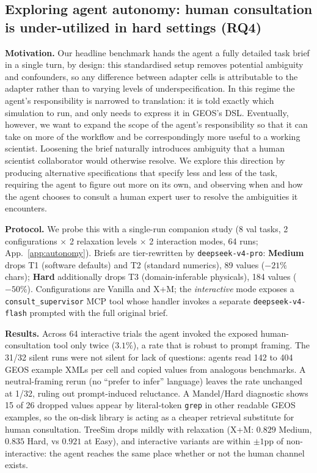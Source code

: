 \documentclass{article}
\begin{document}
\subsection{Exploring agent autonomy: human consultation is under-utilized in hard settings (RQ4)}
\label{subsec:autonomy}

\textbf{Motivation.} Our headline benchmark hands the agent a fully detailed task brief in a single turn, by design: this standardised setup removes potential ambiguity and confounders, so any difference between adapter cells is attributable to the adapter rather than to varying levels of underspecification. In this regime the agent's responsibility is narrowed to translation: it is told exactly which simulation to run, and only needs to express it in GEOS's DSL. Eventually, however, we want to expand the scope of the agent's responsibility so that it can take on more of the workflow and be correspondingly more useful to a working scientist. Loosening the brief naturally introduces ambiguity that a human scientist collaborator would otherwise resolve. We explore this direction by producing alternative specifications that specify less and less of the task, requiring the agent to figure out more on its own, and observing when and how the agent chooses to consult a human expert user to resolve the ambiguities it encounters.

\textbf{Protocol.} We probe this with a single-run companion study (8 val tasks, 2 configurations $\times$ 2 relaxation levels $\times$ 2 interaction modes, 64 runs; App.~\ref{app:autonomy}). Briefs are tier-rewritten by \texttt{deepseek-v4-pro}: \textbf{Medium} drops T1 (software defaults) and T2 (standard numerics), 89 values ($-21\%$ chars); \textbf{Hard} additionally drops T3 (domain-inferable physicals), 184 values ($-50\%$). Configurations are Vanilla and X+M; the \emph{interactive} mode exposes a \texttt{consult\_supervisor} MCP tool whose handler invokes a separate \texttt{deepseek-v4-flash} prompted with the full original brief.

\textbf{Results.} Across 64 interactive trials the agent invoked the exposed human-consultation tool only twice ($3.1\%$), a rate that is robust to prompt framing. The 31/32 silent runs were not silent for lack of questions: agents read 142 to 404 GEOS example XMLs per cell and copied values from analogous benchmarks. A neutral-framing rerun (no ``prefer to infer'' language) leaves the rate unchanged at 1/32, ruling out prompt-induced reluctance. A Mandel/Hard diagnostic shows 15 of 26 dropped values appear by literal-token \texttt{grep} in other readable GEOS examples, so the on-disk library is acting as a cheaper retrieval substitute for human consultation. TreeSim drops mildly with relaxation (X+M: $0.829$ Medium, $0.835$ Hard, vs $0.921$ at Easy), and interactive variants are within $\pm 1$pp of non-interactive: the agent reaches the same place whether or not the human channel exists.
\end{document}
